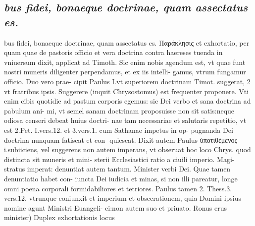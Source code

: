 \documentclass{article}
\begin{document}
\begin{pages}
\subsection*{\textit{bus fidei, bonaeque doctrinae, quam assectatus es.}}bus fidei, bonaeque doctrinae, quam assectatus es. Παράκλησις et exhortatio, per quam quae de pastoris officio et vera doctrina contra haereses tuenda in vniuersum dixit, applicat ad Timoth. Sic enim nobis agendum est, vt quae funt nostri muneris diligenter perpendamus, et ex iis intelli- gamus, vtrum fungamur officio. Duo vero prae- cipit Paulus I.vt superiorem doctrinam Timot. suggerat, 2 vt fratribus ipsis. Suggerere (inquit Chrysostomus) est frequenter proponere. Vti enim cibis quotidie ad pastum corporis egemus: sic Dei verbo et sana doctrina ad pabulum ani- mi, vt semel sanam doctrinam proposuisse non sit satis:neque odiosa censeri debeat huius doctri- nae tam necessariae et salutaris repetitio, vt est 2.Pet. I.vers.12. et 3.vers.1. cum Sathanae impetus in op- pugnanda Dei doctrina nunquam fatiscat et con- quiescat. Dixit autem Paulus ὐποτιθέμενος i.subiiciens, vel suggerens non autem imperans, vt obseruat hoc loco Chrys. quod distincta sit muneris et mini- sterii Ecclesiastici ratio a ciuili imperio. Magi- stratus imperat: denuntiat autem tantum. Minister verbi Dei. Quae tamen denuntiatio habet con- iuncta Dei iudicia et minas, si non illi pareatur, longe omni poena corporali formidabiliores et tetriores. Paulus tamen 2. Thess.3. vers.12. vtrunque coniunxit et imperium et obsecrationem, quia Domini ipsius nomine agunt Ministri Euangeli- ci:non autem suo et priuato. Ronus erus minister) Duplex exhortationis locus  \pend

\end{pages}
\end{document}
